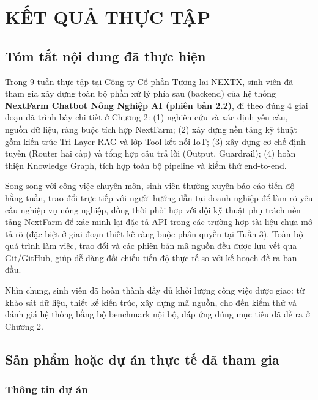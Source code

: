 
\chapter{KẾT QUẢ THỰC TẬP}

\section{Tóm tắt nội dung đã thực hiện}

Trong 9 tuần thực tập tại Công ty Cổ phần Tương lai NEXTX, sinh viên đã tham gia xây
dựng toàn bộ phần xử lý phía sau (backend) của hệ thống \textbf{NextFarm Chatbot Nông
Nghiệp AI (phiên bản 2.2)}, đi theo đúng 4 giai đoạn đã trình bày chi tiết ở Chương 2:
(1) nghiên cứu và xác định yêu cầu, nguồn dữ liệu, ràng buộc tích hợp NextFarm; (2) xây
dựng nền tảng kỹ thuật gồm kiến trúc Tri-Layer RAG và lớp Tool kết nối IoT; (3) xây dựng
cơ chế định tuyến (Router hai cấp) và tổng hợp câu trả lời (Output, Guardrail); (4) hoàn
thiện Knowledge Graph, tích hợp toàn bộ pipeline và kiểm thử end-to-end.

Song song với công việc chuyên môn, sinh viên thường xuyên báo cáo tiến độ hằng tuần,
trao đổi trực tiếp với người hướng dẫn tại doanh nghiệp để làm rõ yêu cầu nghiệp vụ nông
nghiệp, đồng thời phối hợp với đội kỹ thuật phụ trách nền tảng NextFarm để xác minh lại
đặc tả API trong các trường hợp tài liệu chưa mô tả rõ (đặc biệt ở giai đoạn thiết kế
ràng buộc phân quyền tại Tuần 3). Toàn bộ quá trình làm việc, trao đổi và các phiên bản
mã nguồn đều được lưu vết qua Git/GitHub, giúp dễ dàng đối chiếu tiến độ thực tế so với
kế hoạch đề ra ban đầu.

Nhìn chung, sinh viên đã hoàn thành đầy đủ khối lượng công việc được giao: từ khảo sát
dữ liệu, thiết kế kiến trúc, xây dựng mã nguồn, cho đến kiểm thử và đánh giá hệ thống
bằng bộ benchmark nội bộ, đáp ứng đúng mục tiêu đã đề ra ở Chương 2.

\section{Sản phẩm hoặc dự án thực tế đã tham gia}

\subsection{Thông tin dự án}

